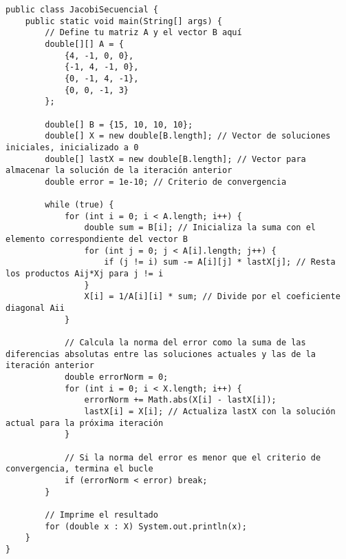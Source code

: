 \documentclass[]{article}
\begin{document}
\begin{verbatim}
public class JacobiSecuencial {
    public static void main(String[] args) {
        // Define tu matriz A y el vector B aquí
        double[][] A = {
            {4, -1, 0, 0},
            {-1, 4, -1, 0},
            {0, -1, 4, -1},
            {0, 0, -1, 3}
        };
        
        double[] B = {15, 10, 10, 10};
        double[] X = new double[B.length]; // Vector de soluciones iniciales, inicializado a 0
        double[] lastX = new double[B.length]; // Vector para almacenar la solución de la iteración anterior
        double error = 1e-10; // Criterio de convergencia

        while (true) {
            for (int i = 0; i < A.length; i++) {
                double sum = B[i]; // Inicializa la suma con el elemento correspondiente del vector B
                for (int j = 0; j < A[i].length; j++) {
                    if (j != i) sum -= A[i][j] * lastX[j]; // Resta los productos Aij*Xj para j != i
                }
                X[i] = 1/A[i][i] * sum; // Divide por el coeficiente diagonal Aii
            }

            // Calcula la norma del error como la suma de las diferencias absolutas entre las soluciones actuales y las de la iteración anterior
            double errorNorm = 0;
            for (int i = 0; i < X.length; i++) {
                errorNorm += Math.abs(X[i] - lastX[i]);
                lastX[i] = X[i]; // Actualiza lastX con la solución actual para la próxima iteración
            }

            // Si la norma del error es menor que el criterio de convergencia, termina el bucle
            if (errorNorm < error) break;
        }

        // Imprime el resultado
        for (double x : X) System.out.println(x);
    }
}
\end{verbatim}
\end{document}
